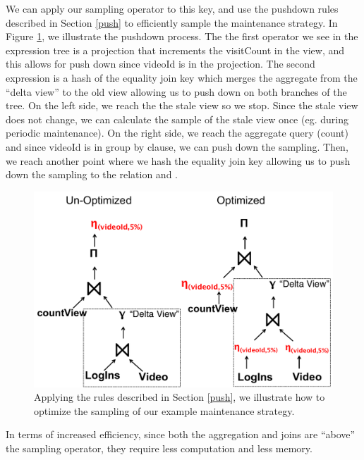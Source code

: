 We can apply our sampling operator to this key, and use the pushdown rules described in Section \ref{push} to efficiently sample the maintenance strategy.
In Figure \ref{exexpr2}, we illustrate the pushdown process.
The the first operator we see in the expression tree is a projection that increments the \textsf{visitCount} in the view, and this allows
for push down since \textsf{videoId} is in the projection.
The second expression is a hash of the equality join key which merges the aggregate from the ``delta view'' to the old view allowing us to push down on both branches of the tree.
On the left side, we reach the the stale view so we stop.
Since the stale view does not change, we can calculate the sample of the stale view once (eg. during periodic maintenance). 
On the right side, we reach the aggregate query (count) and since \textsf{videoId} is in group by clause, we can push down the sampling.
Then, we reach another point where we hash the equality join key allowing us to push down the sampling to the relation  and .

\begin{figure}[t] \vspace{-2em}
\centering
 \includegraphics[scale=0.20]{figs/example_expression_tree_2.pdf} \vspace{-.25em}
 \caption{Applying the rules described in Section \ref{push}, we illustrate how to optimize the sampling of our example maintenance strategy.  \label{exexpr2}}\vspace{-1.75em}
\end{figure}

In terms of increased efficiency, since both the aggregation and joins are ``above'' the sampling operator, they require less computation and less memory.


